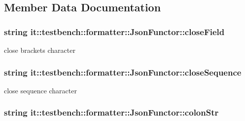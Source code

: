 \subsection{Member Data Documentation}
\hypertarget{classit_1_1testbench_1_1formatter_1_1JsonFunctor_aa97e0fae1afc098f3331a20431ce9c61}{
\subsubsection[{close\-Field}]{\setlength{\rightskip}{0pt plus 5cm}string it\-::testbench\-::formatter\-::\-Json\-Functor\-::close\-Field\hspace{0.3cm}{\ttfamily [private]}}}\label{d0/def/classit_1_1testbench_1_1formatter_1_1JsonFunctor_aa97e0fae1afc098f3331a20431ce9c61}
close brackets character \hypertarget{classit_1_1testbench_1_1formatter_1_1JsonFunctor_a94d9c78f645a47ebe5b81b3109240c5f}{
\subsubsection[{close\-Sequence}]{\setlength{\rightskip}{0pt plus 5cm}string it\-::testbench\-::formatter\-::\-Json\-Functor\-::close\-Sequence\hspace{0.3cm}{\ttfamily [private]}}}\label{d0/def/classit_1_1testbench_1_1formatter_1_1JsonFunctor_a94d9c78f645a47ebe5b81b3109240c5f}
close sequence character \hypertarget{classit_1_1testbench_1_1formatter_1_1JsonFunctor_a01058b4edc6d82200275bfe3c605d251}{
\subsubsection[{colon\-Str}]{\setlength{\rightskip}{0pt plus 5cm}string it\-::testbench\-::formatter\-::\-Json\-Functor\-::colon\-Str\hspace{0.3cm}{\ttfamily [private]}}}\label{d0/def/classit_1_1testbench_1_1formatter_1_1JsonFunctor_a01058b4edc6d82200275bfe3c605d251}
